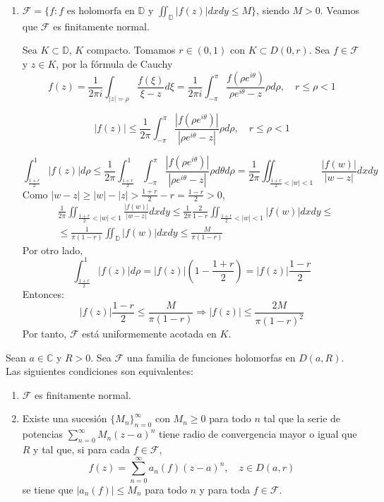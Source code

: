 \begin{example}
\begin{enumerate}
        \item $\mathcal{F} = \{f : f \text{ es holomorfa en } \mathbb{D} \text{ y } \iint_\mathbb{D} |f(z)|dxdy \leq M\}$, siendo $M > 0$.
              Veamos que $\mathcal{F}$ es finitamente normal.

              Sea $K \subset \mathbb{D}$, $K$ compacto.
              Tomamos $r \in (0, 1)$ con $K \subset D(0, r)$.
              Sea $f \in \mathcal{F}$ y $z \in K$, por la fórmula de Cauchy
              $$f(z) = \frac{1}{2\pi i} \int_{|z| = \rho} \frac{f(\xi)}{\xi-z}d\xi = \frac{1}{2\pi i} \int_{-\pi}^\pi \frac{f(\rho e^{i\theta})}{\rho e^{i\theta} - z}\rho d\rho, \quad r \leq \rho < 1$$

              $$|f(z)| \leq \frac{1}{2\pi} \int_{-\pi}^\pi \frac{|f(\rho e^{i\theta})|}{|\rho e^{i\theta} - z|}\rho d\rho, \quad r \leq \rho < 1$$

              $$\int_{\frac{1+r}{2}}^1 |f(z)|d\rho \leq \frac{1}{2\pi} \int_{\frac{1+r}{2}}^1 \int_{-\pi}^\pi \frac{|f(\rho e^{i\theta})|}{|\rho e^{i\theta} - z|}\rho d\theta d\rho = \frac{1}{2\pi} \iint_{\frac{1+r}{2} < |w| < 1} \frac{|f(w)|}{|w-z|}dxdy$$
              Como $|w-z| \geq |w| - |z| > \frac{1+r}{2}-r = \frac{1-r}{2} > 0$,
              \begin{align*}
                   & \frac{1}{2\pi} \iint_{\frac{1+r}{2} < |w| < 1} \frac{|f(w)|}{|w-z|}dxdy \leq \frac{1}{2\pi} \frac{2}{1-r} \iint_{\frac{1+r}{2} < |w| < 1} |f(w)| dxdy \leq \\
                   & \leq \frac{1}{\pi(1-r)} \iint_\mathbb{D} |f(w)|dxdy \leq \frac{M}{\pi(1-r)}
              \end{align*}
              Por otro lado,
              $$\int_{\frac{1+r}{2}}^1 |f(z)|d\rho = |f(z)|\left(1 - \frac{1+r}{2}\right) = |f(z)|\frac{1-r}{2}$$
              Entonces:
              $$|f(z)|\frac{1-r}{2} \leq \frac{M}{\pi(1-r)} \Rightarrow |f(z)| \leq \frac{2M}{\pi(1-r)^2}$$
              Por tanto, $\mathcal{F}$ está uniformemente acotada en $K$.
    \end{enumerate}
\end{example}

\begin{theorem}
    Sean $a \in \mathbb{C}$ y $R > 0$.
    Sea $\mathcal{F}$ una familia de funciones holomorfas en $D(a, R)$.
    Las siguientes condiciones son equivalentes:
    \begin{enumerate}
        \item $\mathcal{F}$ es finitamente normal.
        \item Existe una sucesión $\{M_n\}_{n=0}^\infty$ con $M_n \geq 0$ para todo $n$ tal que la serie de potencias $\sum_{n=0}^\infty M_n(z-a)^n$ tiene radio de convergencia mayor o igual que $R$ y tal que, si para cada $f \in \mathcal{F}$,
              $$f(z) = \sum_{n=0}^\infty a_n(f)(z-a)^n, \quad z \in D(a, r)$$
              se tiene que $|a_n(f)| \leq M_n$ para todo $n$ y para toda $f \in \mathcal{F}$.
    \end{enumerate}
\end{theorem}

